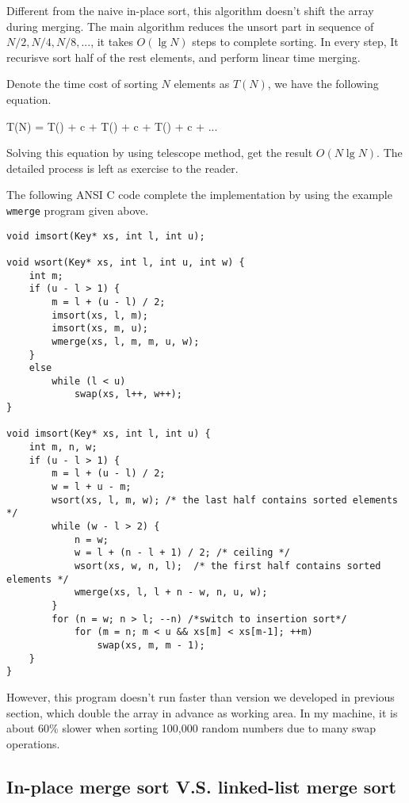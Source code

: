 \documentclass{article}
\begin{document}
Different from the naive in-place sort, this algorithm doesn't shift the array during merging. The main
algorithm reduces the unsort part in sequence of $N/2, N/4, N/8, ...$, it takes $O(\lg N)$ steps to complete
sorting. In every step, It recurisve sort half of the rest elements, and perform linear time merging.

Denote the time cost of sorting $N$ elements as $T(N)$, we have the following equation.

\be
T(N) = T() + c  + T() + c  + T() + c  + ...
\ee

Solving this equation by using telescope method, get the result $O(N \lg N)$. The detailed process is
left as exercise to the reader.

The following ANSI C code complete the implementation by using the example \verb|wmerge| program given 
above.

\lstset{language=C}
\begin{lstlisting}
void imsort(Key* xs, int l, int u);

void wsort(Key* xs, int l, int u, int w) {
    int m;
    if (u - l > 1) {
        m = l + (u - l) / 2;
        imsort(xs, l, m);
        imsort(xs, m, u);
        wmerge(xs, l, m, m, u, w);
    }
    else
        while (l < u)
            swap(xs, l++, w++);
}

void imsort(Key* xs, int l, int u) {
    int m, n, w;
    if (u - l > 1) {
        m = l + (u - l) / 2;
        w = l + u - m;
        wsort(xs, l, m, w); /* the last half contains sorted elements */
        while (w - l > 2) {
            n = w;
            w = l + (n - l + 1) / 2; /* ceiling */
            wsort(xs, w, n, l);  /* the first half contains sorted elements */
            wmerge(xs, l, l + n - w, n, u, w);
        }
        for (n = w; n > l; --n) /*switch to insertion sort*/
            for (m = n; m < u && xs[m] < xs[m-1]; ++m)
                swap(xs, m, m - 1);
    }
}
\end{lstlisting}

However, this program doesn't run faster than version we developed in previous section, which double
the array in advance as working area. In my machine, it is about 60\% slower when sorting 100,000 random 
numbers due to many swap operations.

\subsection{In-place merge sort V.S. linked-list merge sort}
\end{document}
